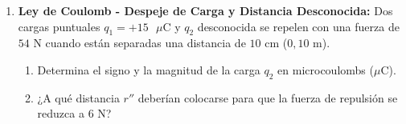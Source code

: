 \documentclass[11pt, letterpaper]{article}
\newif\ifshowanswers
\newcommand{\answer}[1]{ 
	\ifshowanswers 
	\par\vspace{0.15cm} 
	\begin{tcolorbox}[colback=blue!5!white, colframe=blue!60!white, arc=1mm, boxrule=0.5pt, title=\textbf{\footnotesize SOLUCIÓN PASO A PASO (DOCENTE)}] 
		\color{blue!80!black}\footnotesize #1 
	\end{tcolorbox} 
	\par\vspace{0.15cm} 
	\else 
	\par\vspace{0.3cm} 
	\fi 
}
\begin{document}
\begin{enumerate}[leftmargin=*, itemsep=0.8cm]
		\item \textbf{ Ley de Coulomb - Despeje de Carga y Distancia Desconocida:} 
		Dos cargas puntuales $q_1 = +15\text{ }\mu\text{C}$ y $q_2$ desconocida se repelen con una fuerza de $54\text{ N}$ cuando están separadas una distancia de $10\text{ cm}$ ($0,10\text{ m}$). 
		\begin{enumerate}[label=\alph*), itemsep=0.2cm] 
			\item Determina el signo y la magnitud de la carga $q_2$ en microcoulombs ($\mu\text{C}$). 
			\item ¿A qué distancia $r''$ deberían colocarse para que la fuerza de repulsión se reduzca a $6\text{ N}$? 
		\end{enumerate} 
		\answer{ 
			\textbf{a) Despeje y signo de $q_2$:} 
			Al ser una fuerza de repulsión y $q_1 > 0$, la carga $q_2$ debe ser obligatoriamente \textbf{positiva} ($+$). 
			\[ F = k \frac{q_1 \cdot q_2}{r^2} \implies q_2 = \frac{F \cdot r^2}{k \cdot q_1} \] 
			\[ q_2 = \frac{(54\text{ N}) \cdot (0,10\text{ m})^2}{(9 \times 10^9\text{ N}\cdot\text{m}^2/\text{C}^2) \cdot (15 \times 10^{-6}\text{ C})} = \frac{0,54}{135000} = \mathbf{4,0 \times 10^{-6}\text{ C}} = \mathbf{+4,0\text{ }\mu\text{C}} \] 
			\textbf{b) Despeje de la nueva distancia:} 
			Para reducir la fuerza de $54\text{ N}$ a $6\text{ N}$ (un factor de $\frac{54}{6} = 9$), la distancia debe triplicarse ($r'' = 3 \cdot r$): 
			\[ r'' = \sqrt{\frac{k \cdot q_1 \cdot q_2}{F''}} = \sqrt{\frac{(9 \times 10^9) \cdot (15 \times 10^{-6}) \cdot (4 \times 10^{-6})}{6}} = \sqrt{\frac{0,54}{6}} = \sqrt{0,09} = \mathbf{0,30\text{ m}} = \mathbf{30\text{ cm}} \] 
		} 
		 

\end{enumerate}
\end{document}
